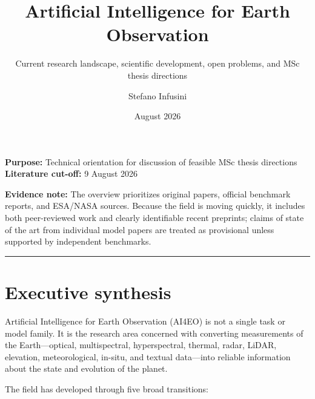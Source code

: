 \documentclass[
  a4paper,
  11pt]{article}
\title{Artificial Intelligence for Earth Observation}
\subtitle{Current research landscape, scientific development, open
problems, and MSc thesis directions}
\author{Stefano Infusini}
\date{August 2026}
\begin{document}
\maketitle

\thispagestyle{empty}
\vfill
\begin{center}
\begin{minipage}{0.86\textwidth}
\centering
\textbf{Purpose:} Technical orientation for discussion of feasible MSc thesis directions\\[0.6em]
\textbf{Literature cut-off:} 9 August 2026
\end{minipage}
\end{center}
\vfill
\clearpage
{}

\renewcommand*\contentsname{Contents}
{
\hypersetup{linkcolor=black}
\setcounter{tocdepth}{3}
\tableofcontents
}
\clearpage
{}
\textbf{Evidence note:} The overview prioritizes original papers,
official benchmark reports, and ESA/NASA sources. Because the field is
moving quickly, it includes both peer-reviewed work and clearly
identifiable recent preprints; claims of state of the art from
individual model papers are treated as provisional unless supported by
independent benchmarks.

\begin{center}\rule{0.5\linewidth}{0.5pt}\end{center}

\hypertarget{executive-synthesis}{%
\section*{Executive synthesis}\label{executive-synthesis}}

Artificial Intelligence for Earth Observation (AI4EO) is not a single
task or model family. It is the research area concerned with converting
measurements of the Earth---optical, multispectral, hyperspectral,
thermal, radar, LiDAR, elevation, meteorological, in-situ, and textual
data---into reliable information about the state and evolution of the
planet.

The field has developed through five broad transitions:
\end{document}
